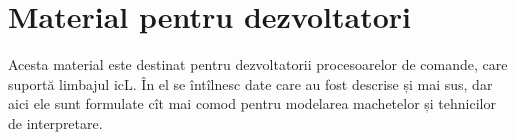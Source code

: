 \part{Material pentru dezvoltatori}

Acesta material este destinat pentru dezvoltatorii procesoarelor de comande, care suportă limbajul icL. În el se întîlnesc date care au fost descrise și mai sus, dar aici ele sunt formulate cît mai comod pentru modelarea machetelor și tehnicilor de interpretare.
